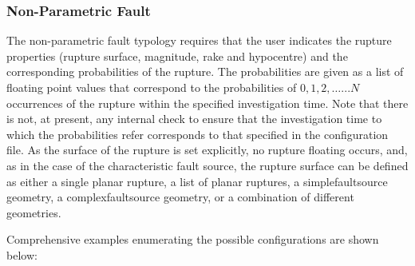 \subsubsection{Non-Parametric Fault}
\label{desc_nonparametric_fault}

The non-parametric fault typology requires that the user indicates the rupture properties (rupture surface, magnitude, rake and hypocentre) and the corresponding probabilities of the rupture. The probabilities are given as a list of floating point values that correspond to the probabilities of $0, 1, 2, \ldots ... N$ occurrences of the rupture within the specified investigation time. Note that there is not, at present, any internal check to ensure that the investigation time to which the probabilities refer corresponds to that specified in the configuration file. As the surface of the rupture is set explicitly, no rupture floating occurs, and, as in the case of the characteristic fault source, the rupture surface can be defined as either a single planar rupture, a list of planar ruptures, a \gls{simplefaultsource} geometry, a \gls{complexfaultsource} geometry, or a combination of different geometries.

Comprehensive examples enumerating the possible configurations are shown below:

\inputminted[firstline=1,firstnumber=1,fontsize=\footnotesize,frame=single,linenos,bgcolor=lightgray]{xml}{oqum/hazard/verbatim/input_nonparametric_planar.xml}
\inputminted[firstline=1,firstnumber=1,fontsize=\footnotesize,frame=single,linenos,bgcolor=lightgray]{xml}{oqum/hazard/verbatim/input_nonparametric_simple.xml}
\inputminted[firstline=1,firstnumber=1,fontsize=\footnotesize,frame=single,linenos,bgcolor=lightgray]{xml}{oqum/hazard/verbatim/input_nonparametric_complex.xml}
